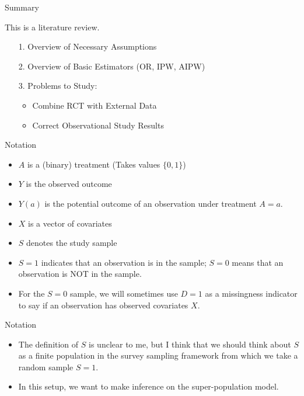 \documentclass[handout]{beamer} %
\begin{document}
\begin{frame}{Summary}

This is a literature review.

\begin{itemize}
  \item[1.] Overview of Necessary Assumptions
  \item[2.] Overview of Basic Estimators (OR, IPW, AIPW)
  \item[3.] Problems to Study:
    \begin{itemize}
      \item Combine RCT with External Data
      \item Correct Observational Study Results
    \end{itemize}
\end{itemize}

\end{frame}

\begin{frame}{Notation}

  \begin{itemize}
    \item $A$ is a (binary) treatment (Takes values $\{0, 1\}$)
    \item $Y$ is the observed outcome
    \item $Y(a)$ is the potential outcome of an observation under 
      treatment $A = a$.
    \item $X$ is a vector of covariates
    \item $S$ denotes the study sample
    \item $S = 1$ indicates that an observation is in the sample; 
      $S = 0$ means that an observation is NOT in the sample.
    \item For the $S = 0$ sample, we will sometimes use $D = 1$ as a 
      missingness indicator to say if an observation has observed 
      covariates $X$.
  \end{itemize}

\end{frame}

\begin{frame}{Notation}

  \begin{itemize}
    \item The definition of $S$ is unclear to me, but I think that we 
      should think about $S$ as a finite population in the survey 
      sampling framework from which we take a random sample $S = 1$.
    \item In this setup, we want to make inference on the super-population
      model.
  \end{itemize}

\end{frame}
\end{document}
